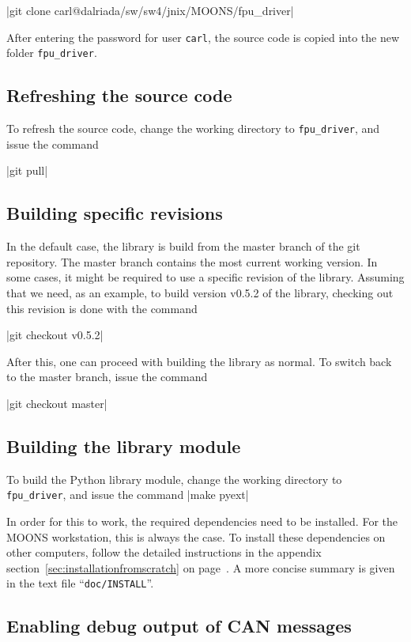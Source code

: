 \documentclass[11pt,a4paper]{report}
\begin{document}
|git clone carl@dalriada/sw/sw4/jnix/MOONS/fpu_driver|

After entering the password for user \texttt{carl}, the
source code is copied into the new folder \texttt{fpu\_driver}.

\subsection{Refreshing the source code}
To refresh the source code, change the
working directory to \texttt{fpu\_driver},
and issue the command

|git pull|


\subsection{Building specific revisions}
In the default case, the library is build from
the master branch of the git repository.
The master branch contains the most current
working version.
In some cases, it might be required to
use a specific revision of the library.
Assuming that we need, as an example,
to build version v0.5.2 of the library,
checking out this revision is done with the
command

|git checkout v0.5.2|

After this, one can proceed with building the library as normal. To
switch back to the master branch, issue the command

|git checkout master|


\subsection{Building the library module}
To build the Python library module,
change the working directory to \texttt{fpu\_driver},
and issue the command |make pyext|

In order for this to work, the required dependencies need to be
installed. For the MOONS workstation, this is always the case. To
install these dependencies on other computers, follow the detailed
instructions in the appendix section~\ref{sec:installationfromscratch}
on page~\pageref{sec:installationfromscratch}.  A more concise summary
is given in the text file ``\texttt{doc/INSTALL}''.

\subsection{Enabling debug output of CAN messages}
\end{document}
